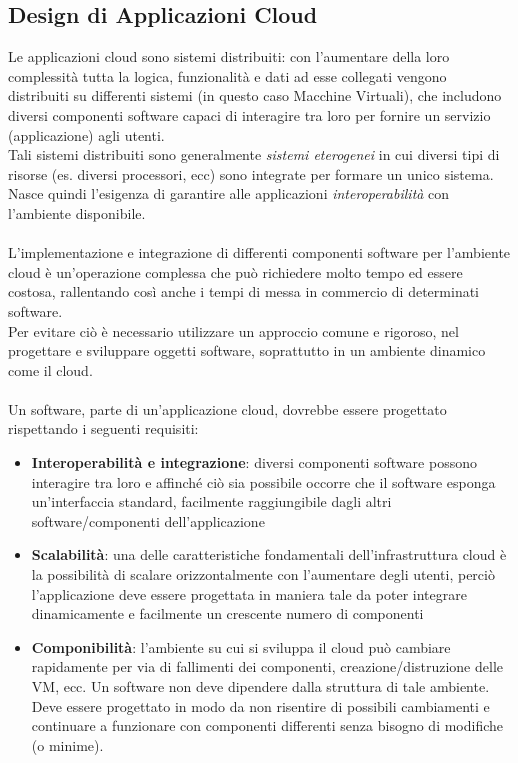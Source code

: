 \documentclass{article}
\begin{document}
\subsection{Design di Applicazioni Cloud}
Le applicazioni cloud sono sistemi distribuiti: con l’aumentare della loro complessità tutta la logica, funzionalità e dati ad esse collegati vengono distribuiti su differenti sistemi (in questo caso Macchine Virtuali), che includono diversi componenti software capaci di interagire tra loro per fornire un servizio (applicazione) agli utenti. \\Tali sistemi distribuiti sono generalmente \textit{sistemi eterogenei} in cui diversi tipi di risorse (es. diversi processori, ecc) sono integrate per formare un unico sistema. \\Nasce quindi l’esigenza di garantire alle applicazioni \textit{interoperabilità} con l’ambiente disponibile. \\ \\L’implementazione e integrazione di differenti componenti software per l’ambiente cloud è un’operazione complessa che può richiedere molto tempo ed essere costosa, rallentando così anche i tempi di messa in commercio di determinati software. \\Per evitare ciò è necessario utilizzare un approccio comune e rigoroso, nel progettare e sviluppare oggetti software, soprattutto in un ambiente dinamico come il cloud.\\ \\Un software, parte di un’applicazione cloud, dovrebbe essere progettato rispettando i seguenti requisiti:
\begin{itemize}
    \item \textbf{Interoperabilità e integrazione}: diversi componenti software possono interagire tra loro e affinché ciò sia possibile occorre che il software esponga un’interfaccia standard, facilmente raggiungibile dagli altri software/componenti dell’applicazione
	\item \textbf{Scalabilità}:  una delle caratteristiche fondamentali dell’infrastruttura cloud è la possibilità di scalare orizzontalmente con l’aumentare degli utenti, perciò l’applicazione deve essere progettata in maniera tale da poter integrare dinamicamente e facilmente un crescente numero di componenti 
    \item \textbf{Componibilità}:  l’ambiente su cui si sviluppa il cloud può cambiare rapidamente per via di fallimenti dei componenti, creazione/distruzione delle VM, ecc. Un software non deve dipendere dalla struttura di tale ambiente. Deve essere progettato in modo da non risentire di possibili cambiamenti e continuare a funzionare con componenti differenti senza bisogno di modifiche (o minime).
\end{itemize}
\end{document}
